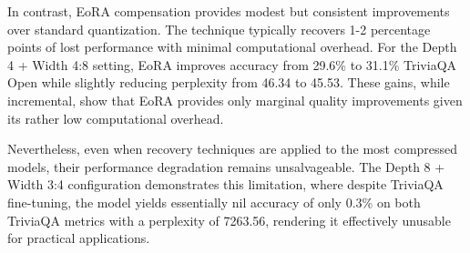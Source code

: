 In contrast, EoRA compensation provides modest but consistent improvements over standard quantization. The technique typically recovers 1-2 percentage points of lost performance with minimal computational overhead. For the Depth 4 + Width 4:8 setting, EoRA improves accuracy from 29.6\% to 31.1\% TriviaQA Open while slightly reducing perplexity from 46.34 to 45.53. These gains, while incremental, show that EoRA provides only marginal quality improvements given its rather low computational overhead.

Nevertheless, even when recovery techniques are applied to the most compressed models, their performance degradation remains unsalvageable. The Depth 8 + Width 3:4 configuration demonstrates this limitation, where despite TriviaQA fine-tuning, the model yields essentially nil accuracy of only 0.3\% on both TriviaQA metrics with a perplexity of 7263.56, rendering it effectively unusable for practical applications.